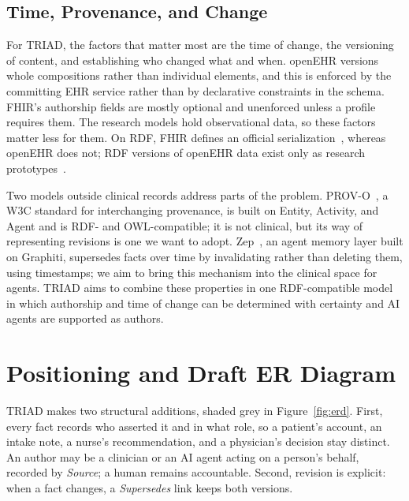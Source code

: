 \documentclass[sigconf]{acmart}
\begin{document}
\subsection{Time, Provenance, and Change}
For TRIAD, the factors that matter most are the time of change, the versioning
of content, and establishing who changed what and when. openEHR versions whole
compositions rather than individual elements, and this is enforced by the
committing EHR service rather than by declarative constraints in the schema.
FHIR's authorship fields are mostly optional and unenforced unless a profile
requires them. The research models hold observational data, so these factors
matter less for them. On RDF, FHIR defines an official
serialization~\cite{fhir-r4}, whereas openEHR does not; RDF versions of
openEHR data exist only as research prototypes~\cite{haarbrandt2016}.

Two models outside clinical records address parts of the problem.
PROV-O~\cite{provo2013}, a W3C standard for interchanging provenance, is built
on Entity, Activity, and Agent and is RDF- and OWL-compatible; it is not
clinical, but its way of representing revisions is one we want to adopt.
Zep~\cite{zep2025}, an agent memory layer built on Graphiti, supersedes facts
over time by invalidating rather than deleting them, using timestamps; we aim
to bring this mechanism into the clinical space for agents. TRIAD aims to
combine these properties in one RDF-compatible model in which authorship and
time of change can be determined with certainty and AI agents are supported as
authors.

\section{Positioning and Draft ER Diagram}
TRIAD makes two structural additions, shaded grey in Figure~\ref{fig:erd}. First, every fact records who asserted it and in what role, so a patient's account, an intake note, a nurse's recommendation, and a physician's decision stay distinct. An author may be a clinician or an AI agent acting on a person's behalf, recorded by \textit{Source}; a human remains accountable. Second, revision is explicit: when a fact changes, a \textit{Supersedes} link keeps both versions.
\end{document}

